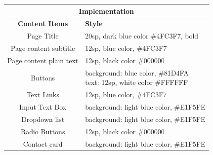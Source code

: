\documentclass{article}
\begin{document}
\begin{center}
  \begin{tabular}{ |c|p{8cm}|  }
  \hline
  \multicolumn{2}{|c|}{\bf Implementation} \\
  \hline
  {\bf Content Items} & {\bf Style} \\
  \hline
  Page Title & 20sp, dark blue color \#4FC3F7, bold \\
  \hline
  Page content subtitle & 12sp, blue color, \#4FC3F7 \\
  \hline
  Page content plain text & 12sp, black color \#000000 \\
    \hline
  Buttons    & \parbox[t]{7cm}{background: blue color, \#81D4FA\\ text: 12sp, white color \#FFFFFF} \\
    \hline
  Text Links & 12sp, blue color, \#4FC3F7 \\
    \hline
  Input Text Box & background: light blue color, \#E1F5FE   \\
    \hline
  Dropdown list & background: light blue color, \#E1F5FE \\
    \hline
  Radio Buttons & 12sp, black color \#000000 \\
    \hline
  Contact card & background: light blue color, \#E1F5FE\\
  \hline
  \end{tabular}
\end{center}
\end{document}
